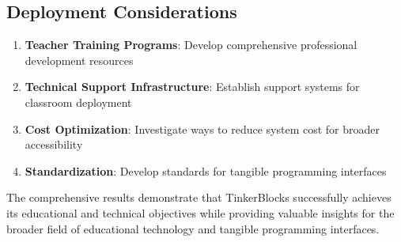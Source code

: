 \subsection{Deployment Considerations}

\begin{enumerate}
    \item \textbf{Teacher Training Programs}: Develop comprehensive professional development resources
    \item \textbf{Technical Support Infrastructure}: Establish support systems for classroom deployment
    \item \textbf{Cost Optimization}: Investigate ways to reduce system cost for broader accessibility
    \item \textbf{Standardization}: Develop standards for tangible programming interfaces
\end{enumerate}

The comprehensive results demonstrate that TinkerBlocks successfully achieves its educational and technical objectives while providing valuable insights for the broader field of educational technology and tangible programming interfaces.